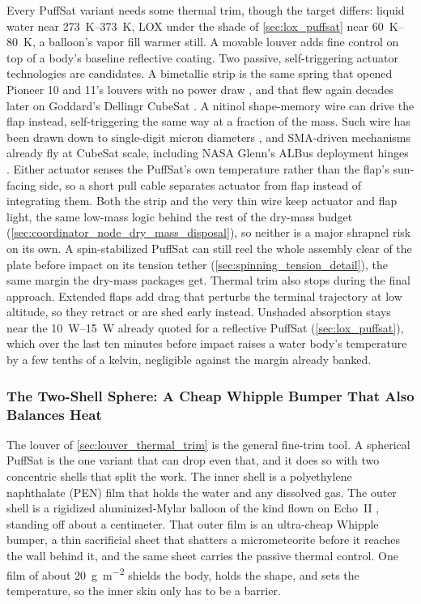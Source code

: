 \documentclass{article}
\begin{document}
Every PuffSat variant needs some thermal trim, though the target differs: liquid water near \SIrange{273}{373}{\kelvin}, LOX under the shade of \autoref{sec:lox_puffsat} near \SIrange{60}{80}{\kelvin}, a balloon's vapor fill warmer still. A movable louver adds fine control on top of a body's baseline reflective coating. Two passive, self-triggering actuator technologies are candidates. A bimetallic strip is the same spring that opened Pioneer 10 and 11's louvers with no power draw \cite{pioneer_anomaly_turyshev}, and that flew again decades later on Goddard's Dellingr CubeSat \cite{dellingr_louver}. A nitinol shape-memory wire can drive the flap instead, self-triggering the same way at a fraction of the mass. Such wire has been drawn down to single-digit micron diameters \cite{fwm_ultrafine_sma_yarn}, and SMA-driven mechanisms already fly at CubeSat scale, including NASA Glenn's ALBus deployment hinges \cite{nasa_glenn_sma_cubesat}. Either actuator senses the PuffSat's own temperature rather than the flap's sun-facing side, so a short pull cable separates actuator from flap instead of integrating them. Both the strip and the very thin wire keep actuator and flap light, the same low-mass logic behind the rest of the dry-mass budget (\autoref{sec:coordinator_node_dry_mass_disposal}), so neither is a major shrapnel risk on its own. A spin-stabilized PuffSat can still reel the whole assembly clear of the plate before impact on its tension tether (\autoref{sec:spinning_tension_detail}), the same margin the dry-mass packages get. Thermal trim also stops during the final approach. Extended flaps add drag that perturbs the terminal trajectory at low altitude, so they retract or are shed early instead. Unshaded absorption stays near the \SIrange{10}{15}{\watt} already quoted for a reflective PuffSat (\autoref{sec:lox_puffsat}), which over the last ten minutes before impact raises a water body's temperature by a few tenths of a kelvin, negligible against the margin already banked.

\subsubsection{The Two-Shell Sphere: A Cheap Whipple Bumper That Also Balances Heat}\label{sec:spherical_water_thermal}

The louver of \autoref{sec:louver_thermal_trim} is the general fine-trim tool. A spherical PuffSat is the one variant that can drop even that, and it does so with two concentric shells that split the work. The inner shell is a polyethylene naphthalate (PEN) film that holds the water and any dissolved gas. The outer shell is a rigidized aluminized-Mylar balloon of the kind flown on Echo~II \cite{nasa_echo_ii_1966}, standing off about a centimeter. That outer film is an ultra-cheap Whipple bumper, a thin sacrificial sheet that shatters a micrometeorite before it reaches the wall behind it, and the same sheet carries the passive thermal control. One film of about \SI{20}{\gram\per\square\meter} shields the body, holds the shape, and sets the temperature, so the inner skin only has to be a barrier.
\end{document}
